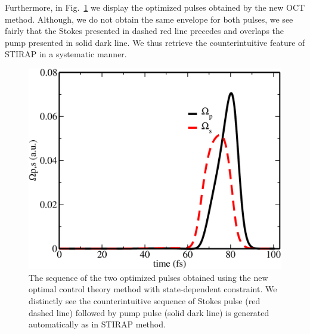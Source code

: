 \documentclass[]{interact}
\theoremstyle{plain}%
\theoremstyle{definition}
\theoremstyle{remark}
\begin{document}
Furthermore, in Fig.~\ref{Fig:Pulses-OCT-NEW} we display the optimized pulses 
obtained by the new OCT method. Although, we do not 
obtain the same envelope for both pulses, we see fairly that the Stokes 
presented in dashed red line precedes and overlaps the pump presented in 
solid dark line. We thus retrieve the counterintuitive feature of STIRAP 
in a systematic manner. 
\begin{figure}[h!]
\centering
\includegraphics[width=0.7\linewidth]{Figure7}
\caption{The sequence of the two optimized pulses obtained 
using the new optimal control theory method with state-dependent constraint. We 
distinctly see the counterintuitive sequence of Stokes pulse (red 
dashed line) followed by pump pulse (solid dark line) is generated 
automatically as in STIRAP method. 
\label{Fig:Pulses-OCT-NEW}}
\end{figure}
\end{document}
